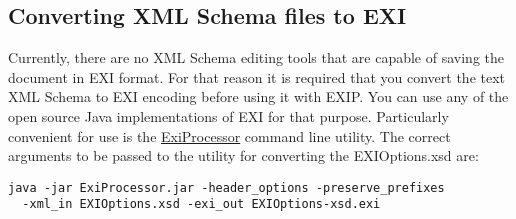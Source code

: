 \subsection{Converting XML Schema files to EXI}
Currently, there are no XML Schema editing tools that are capable of saving the document in EXI format.
For that reason it is required that you convert the text XML Schema to EXI encoding before using it
with EXIP. You can use any of the open source Java implementations of EXI for that purpose. Particularly
convenient for use is the \href{http://sourceforge.net/projects/exiprocessor/files/}{ExiProcessor} command line utility.
The correct arguments to be passed to the utility for converting the EXIOptions.xsd are:
\begin{lstlisting}
java -jar ExiProcessor.jar -header_options -preserve_prefixes
  -xml_in EXIOptions.xsd -exi_out EXIOptions-xsd.exi
\end{lstlisting}